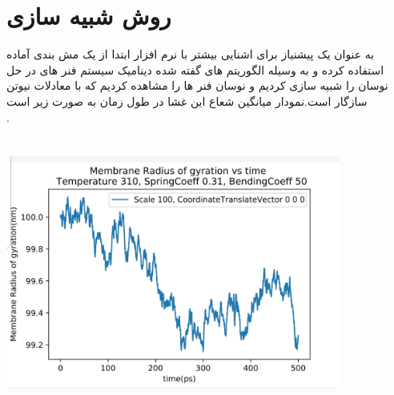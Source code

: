 \documentclass[12pt,onecolumn,a4paper]{report}
\begin{document}
{\section{\LARGE{روش شبیه سازی}}
به عنوان یک پیشنیاز برای اشنایی بیشتر با نرم افزار ابتدا از یک مش بندی آماده استفاده کرده و به  وسیله الگوریتم های گفته شده دینامیک سیستم فنر های در حل نوسان را شبیه سازی کردیم و نوسان فنر ها را مشاهده کردیم که با معادلات نیوتن سازگار است.نمودار میانگین شعاع این غشا در طول زمان به صورت زیر است\\.
\begin{center}
\includegraphics[width=11cm, height=9cm]{20210215_142631.jpg}
\end{center}\\

}
\end{document}
